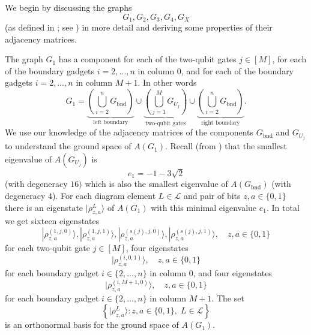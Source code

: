 \documentclass[../thesis-main/thesis-main]{subfiles}
\begin{document}
We begin by discussing the graphs
\begin{equation}
G_{1},G_{2},G_{3},G_{4},G_X
\end{equation}
(as defined in ; see ) in more detail and deriving some properties of their adjacency matrices.

The graph $G_{1}$ has a component for each of the two-qubit gates $j \in [M]$, for each of the boundary gadgets $i=2,\ldots,n$ in column $0$, and for each of the boundary gadgets $i=2,\ldots,n$ in column $M+1$. In other words 
\begin{equation}
G_{1}=\underbrace{\left(\bigcup_{i=2}^{n}G_{\text{bnd}}\right)}_{\text{left boundary}}\cup\underbrace{\left(\bigcup_{j=1}^{M}G_{U_j}\right)}_{\text{two-qubit gates}}\cup\underbrace{\left(\bigcup_{i=2}^{n}G_{\text{bnd}}\right)}_{\text{right boundary}}.\label{eq:G_alpha}
\end{equation}
We use our knowledge of the adjacency matrices of the components $G_\text{bnd}$ and $G_{U_j}$ to understand the ground space of $A(G_1)$.  Recall (from ) that the smallest eigenvalue of $A(G_{U_j})$ is 
\begin{equation}
e_{1}=-1-3\sqrt{2}
\end{equation}
(with degeneracy $16)$ which is also the smallest eigenvalue of $A(G_{\text{bnd}})$ (with degeneracy $4$). For each diagram element $L\in\mathcal{L}$ and pair of bits $z,a\in\{0,1\}$ there is an eigenstate $|\rho_{z,a}^{L}\rangle$ of $A(G_{1})$ with this minimal eigenvalue $e_{1}$. In total we get sixteen eigenstates
\begin{equation}
|\rho_{z,a}^{(1,j,0)}\rangle,|\rho_{z,a}^{(1,j,1)}\rangle,|\rho_{z,a}^{(s(j),j,0)}\rangle,|\rho_{z,a}^{(s(j),j,1)}\rangle,\quad z,a\in\{0,1\}
\end{equation}
for each two-qubit gate $j\in[M]$, four eigenstates 
\begin{equation}
|\rho_{z,a}^{(i,0,1)}\rangle,\quad z,a\in\{0,1\}
\end{equation}
for each boundary gadget $i\in\{2,\ldots,n\}$ in column $0$, and four eigenstates 
\begin{equation}
|\rho_{z,a}^{(i,M+1,0)}\rangle,\quad z,a\in\{0,1\}
\end{equation}
for each boundary gadget $i\in\{2,\ldots,n\}$ in column $M+1$. The set 
\begin{equation}
\left\{ |\rho_{z,a}^{L}\rangle\colon z,a\in\{0,1\},\; L\in\mathcal{L}\right\} 
\end{equation}
is an orthonormal basis for the ground space of $A(G_{1})$. 
\end{document}
